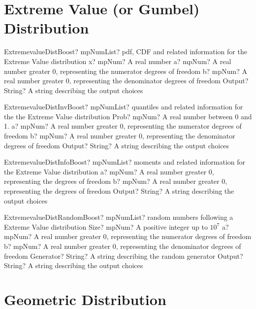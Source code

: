 \documentclass[12pt,a4paper,openany]{book}
\begin{document}
\section{Extreme Value (or Gumbel) Distribution}

\begin{mpFunctionsExtract}
\mpFunctionFourNotImplemented
{ExtremevalueDistBoost? mpNumList? pdf, CDF and related information for the Extreme Value distribution}
{x? mpNum? A real number}
{a? mpNum? A real number greater 0, representing the numerator  degrees of freedom}
{b? mpNum? A real number greater 0, representing the denominator degrees of freedom}
{Output? String? A string describing the output choices}
\end{mpFunctionsExtract}

\begin{mpFunctionsExtract}
\mpFunctionFourNotImplemented
{ExtremevalueDistInvBoost? mpNumList? quantiles and related information for the the Extreme Value distribution}
{Prob? mpNum? A real number between 0 and 1.}
{a? mpNum? A real number greater 0, representing the numerator  degrees of freedom}
{b? mpNum? A real number greater 0, representing the denominator degrees of freedom}
{Output? String? A string describing the output choices}
\end{mpFunctionsExtract}

\begin{mpFunctionsExtract}
\mpFunctionThreeNotImplemented
{ExtremevalueDistInfoBoost? mpNumList? moments and related information for the Extreme Value distribution}
{a? mpNum? A real number greater 0, representing the degrees of freedom}
{b? mpNum? A real number greater 0, representing the degrees of freedom}
{Output? String? A string describing the output choices}
\end{mpFunctionsExtract}

\begin{mpFunctionsExtract}
\mpFunctionFiveNotImplemented
{ExtremevalueDistRandomBoost? mpNumList? random numbers following a Extreme Value distribution}
{Size? mpNum? A positive integer up to $10^7$}
{a? mpNum? A real number greater 0, representing the numerator  degrees of freedom}
{b? mpNum? A real number greater 0, representing the denominator degrees of freedom}
{Generator? String? A string describing the random generator}
{Output? String? A string describing the output choices}
\end{mpFunctionsExtract}

\section{Geometric Distribution}
\end{document}
